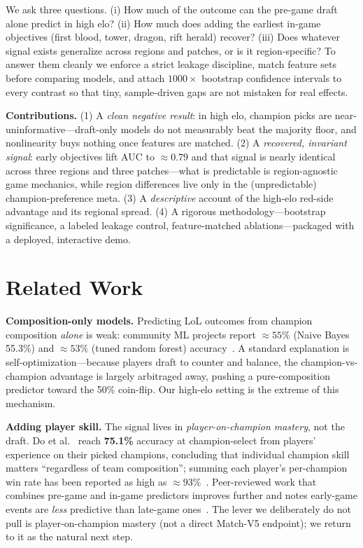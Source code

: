 \documentclass[sigconf,nonacm]{acmart}
\begin{document}
We ask three questions. (i) How much of the outcome can the pre-game draft alone
predict in high elo? (ii) How much does adding the earliest in-game objectives
(first blood, tower, dragon, rift herald) recover? (iii) Does whatever signal
exists generalize across regions and patches, or is it region-specific? To
answer them cleanly we enforce a strict leakage discipline, match feature sets
before comparing models, and attach $1000\times$ bootstrap confidence intervals
to every contrast so that tiny, sample-driven gaps are not mistaken for real
effects.

\noindent\textbf{Contributions.} (1) A \emph{clean negative result}: in high elo,
champion picks are near-uninformative---draft-only models do not measurably beat
the majority floor, and nonlinearity buys nothing once features are matched.
(2) A \emph{recovered, invariant signal}: early objectives lift AUC to
$\approx 0.79$ and that signal is nearly identical across three regions and three
patches---what is predictable is region-agnostic game mechanics, while region
differences live only in the (unpredictable) champion-preference meta. (3) A
\emph{descriptive} account of the high-elo red-side advantage and its regional
spread. (4) A rigorous methodology---bootstrap significance, a labeled leakage
control, feature-matched ablations---packaged with a deployed, interactive demo.

\section{Related Work}
\textbf{Composition-only models.} Predicting LoL outcomes from champion
composition \emph{alone} is weak: community ML projects report $\approx 55\%$
(Naive Bayes 55.3\%) and $\approx 53\%$ (tuned random forest) accuracy~\cite{comp}.
A standard explanation is self-optimization---because players draft to counter
and balance, the champion-vs-champion advantage is largely arbitraged away,
pushing a pure-composition predictor toward the 50\% coin-flip. Our high-elo
setting is the extreme of this mechanism.

\textbf{Adding player skill.} The signal lives in
\emph{player-on-champion mastery}, not the draft. Do et al.~\cite{do2021} reach
\textbf{75.1\%} accuracy at champion-select from players' experience on their
picked champions, concluding that individual champion skill matters
``regardless of team composition''; summing each player's per-champion win rate
has been reported as high as $\approx 93\%$~\cite{do2021}. Peer-reviewed work that
combines pre-game and in-game predictors improves further and notes early-game
events are \emph{less} predictive than late-game ones~\cite{combined}. The lever
we deliberately do not pull is player-on-champion mastery (not a direct Match-V5
endpoint); we return to it as the natural next step.
\end{document}
